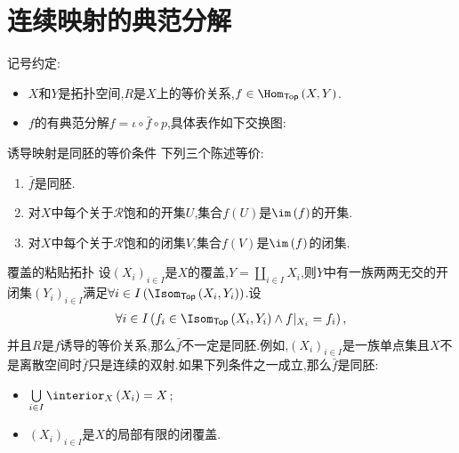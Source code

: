 \section{连续映射的典范分解}

记号约定:
\begin{itemize}
	\item $X$和$Y$是拓扑空间,$R$是$X$上的等价关系,$f\in\Hom_{\mathsf{Top}}\left(X,Y\right)$.
	\item $f$的有典范分解$f=\iota\circ\bar{f}\circ p$,具体表作如下交换图:
	\begin{center}
	\end{center}
\end{itemize}

\begin{proposition}{诱导映射是同胚的等价条件}{}
	下列三个陈述等价:
	\begin{enumerate}
		\item $\bar{f}$是同胚.
		\item 对$X$中每个关于$\mathcal{R}$饱和的开集$U$,集合$f\left(U\right)$是$\im\left(f\right)$的开集.
		\item 对$X$中每个关于$\mathcal{R}$饱和的闭集$V$,集合$f\left(V\right)$是$\im\left(f\right)$的闭集.
	\end{enumerate}
\end{proposition}

\begin{example}{覆盖的粘贴拓扑}{}
	设$\left(X_{i}\right)_{i\in I}$是$X$的覆盖,$Y=\coprod\limits_{i\in I}X_{i}$,则$Y$中有一族两两无交的开闭集$\left(Y_{i}\right)_{i\in I}$满足$\forall i\in I\left(\Isom_{\mathsf{Top}}\left(X_{i},Y_{i}\right)\right)$.设
	\begin{align*}
		\forall i\in I\left(f_{i}\in\Isom_{\mathsf{Top}}\left(X_{i},Y_{i}\right)\wedge f|_{X_{i}}=f_{i}\right),
	\end{align*}
	并且$R$是$f$诱导的等价关系,那么$\bar{f}$不一定是同胚.例如,$\left(X_{i}\right)_{i\in I}$是一族单点集且$X$不是离散空间时$\bar{f}$只是连续的双射.如果下列条件之一成立,那么$\bar{f}$是同胚:
	\begin{itemize}
		\item $\bigcup\limits_{i\in I}\interior_{X}\left(X_{i}\right)=X$;
		\item $\left(X_{i}\right)_{i\in I}$是$X$的局部有限的闭覆盖.
	\end{itemize}
\end{example}

